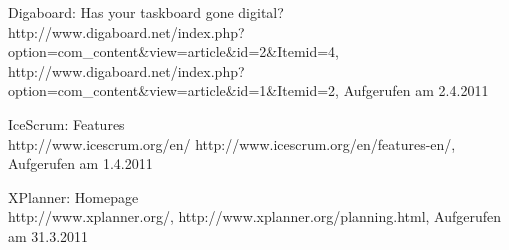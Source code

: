 \documentclass[german,english]{header}
\begin{document}
\begin{thebibliography}{5}
Digaboard: Has your taskboard gone digital?
http://www.digaboard.net/index.php?option=com\_content\&view=article\&id=2\&Itemid=4,
http://www.digaboard.net/index.php?option=com\_content\&view=article\&id=1\&Itemid=2,
Aufgerufen am 2.4.2011

IceScrum: Features\\
http://www.icescrum.org/en/
http://www.icescrum.org/en/features-en/,
Aufgerufen am 1.4.2011

XPlanner: Homepage\\
http://www.xplanner.org/,
http://www.xplanner.org/planning.html,
Aufgerufen am 31.3.2011

\end{thebibliography}
\end{document}
